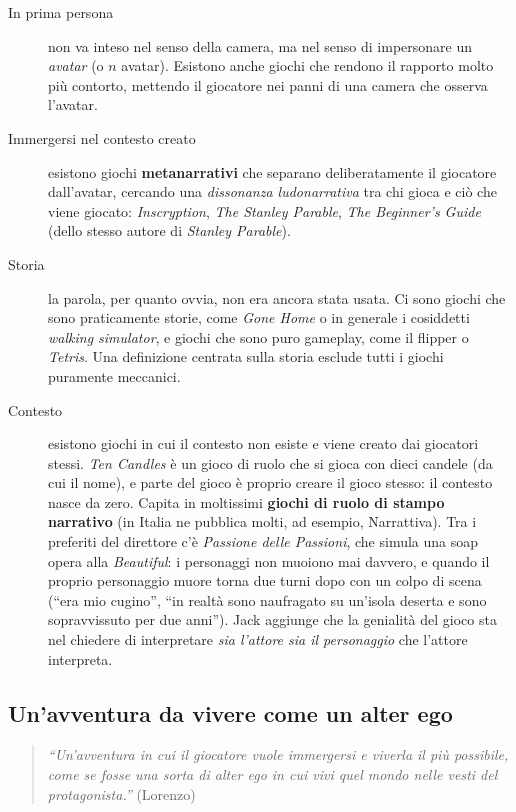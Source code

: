 \begin{description}
  \item[In prima persona] non va inteso nel senso della camera, ma nel senso
        di impersonare un \emph{avatar} (o $n$ avatar). Esistono anche giochi
        che rendono il rapporto molto più contorto, mettendo il giocatore nei
        panni di una camera che osserva l'avatar.
  \item[Immergersi nel contesto creato] esistono giochi
        \textbf{metanarrativi} che separano deliberatamente il giocatore
        dall'avatar, cercando una \emph{dissonanza ludonarrativa} tra chi gioca
        e ciò che viene giocato: \emph{Inscryption}, \emph{The Stanley
        Parable}, \emph{The Beginner's Guide} (dello stesso autore di
        \emph{Stanley Parable}).
  \item[Storia] la parola, per quanto ovvia, non era ancora stata usata. Ci
        sono giochi che sono praticamente storie, come \emph{Gone Home} o in
        generale i cosiddetti \emph{walking simulator}, e giochi che sono puro
        gameplay, come il flipper o \emph{Tetris}. Una definizione centrata
        sulla storia esclude tutti i giochi puramente meccanici.
  \item[Contesto] esistono giochi in cui il contesto non esiste e viene creato
        dai giocatori stessi. \emph{Ten Candles} è un gioco di ruolo che si
        gioca con dieci candele (da cui il nome), e parte del gioco è proprio
        creare il gioco stesso: il contesto nasce da zero. Capita in moltissimi
        \textbf{giochi di ruolo di stampo narrativo} (in Italia ne pubblica
        molti, ad esempio, Narrattiva). Tra i preferiti del direttore c'è
        \emph{Passione delle Passioni}, che simula una soap opera alla
        \emph{Beautiful}: i personaggi non muoiono mai davvero, e quando il
        proprio personaggio muore torna due turni dopo con un colpo di scena
        (``era mio cugino'', ``in realtà sono naufragato su un'isola deserta e
        sono sopravvissuto per due anni''). Jack aggiunge che la genialità del
        gioco sta nel chiedere di interpretare \emph{sia l'attore sia il
        personaggio} che l'attore interpreta.
\end{description}

\subsection{Un'avventura da vivere come un alter ego}

\begin{quote}
\emph{``Un'avventura in cui il giocatore vuole immergersi e viverla il più
possibile, come se fosse una sorta di alter ego in cui vivi quel mondo nelle
vesti del protagonista.''} (Lorenzo)
\end{quote}

